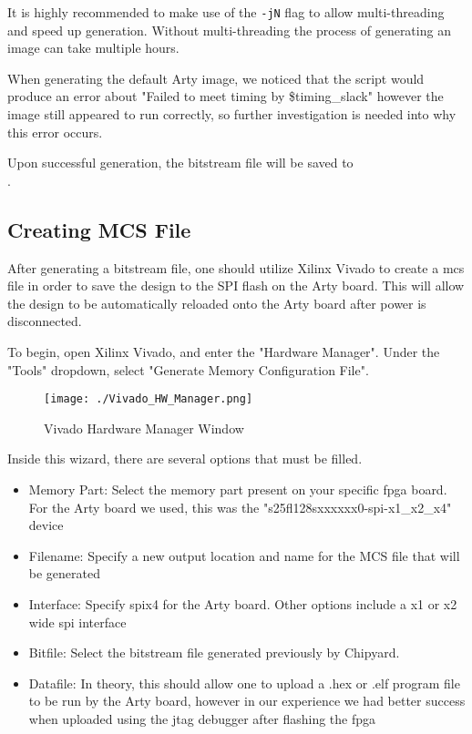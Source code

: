 	It is highly recommended to make use of the \texttt{-jN} flag to allow multi-threading and speed up generation. Without multi-threading the process of generating an image can take multiple hours.
	
	When generating the default Arty image, we noticed that the script would produce an error about "Failed to meet timing by \$timing\_slack" however the image still appeared to run correctly, so further investigation is needed into why this error occurs.
	
	Upon successful generation, the bitstream file will be saved to \\ . 
	
\subsection{Creating MCS File}
	After generating a bitstream file, one should utilize Xilinx Vivado to create a \gls{mcs} file in order to save the design to the SPI flash on the Arty board. This will allow the design to be automatically reloaded onto the Arty board after power is disconnected.
	
	To begin, open Xilinx Vivado, and enter the "Hardware Manager". Under the "Tools" dropdown, select "Generate Memory Configuration File".
	\begin{figure}[h!tbp]
		\centering
		\texttt{[image: ./Vivado\_HW\_Manager.png]}
		\caption{Vivado Hardware Manager Window}
		\label{fig:Vivado_HW_Manager}
	\end{figure}

	Inside this wizard, there are several options that must be filled.
	\begin{itemize}
		\item Memory Part: Select the memory part present on your specific \Gls{fpga} board. For the Arty board we used, this was the "s25fl128sxxxxxx0-spi-x1\_x2\_x4" device
		\item Filename: Specify a new output location and name for the MCS file that will be generated
		\item Interface: Specify \Gls{spi}x4 for the Arty board. Other options include a x1 or x2 wide \Gls{spi} interface
		\item Bitfile: Select the bitstream file generated previously by Chipyard.
		\item Datafile: In theory, this should allow one to upload a .hex or .elf program file to be run by the Arty board, however in our experience we had better success when uploaded using the \Gls{jtag} debugger after flashing the \Gls{fpga}
	\end{itemize}

